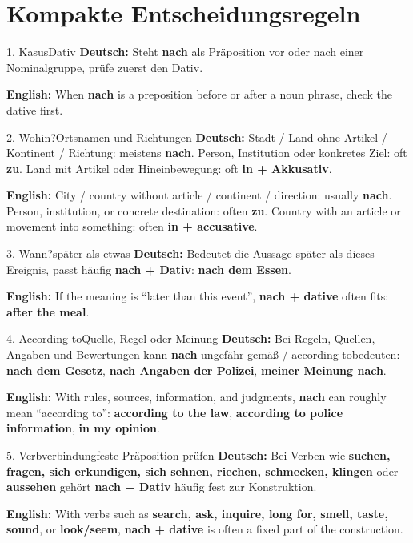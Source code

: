 \documentclass[a4paper,11pt]{article}
\newcommand{\GermanText}[1]{\textbf{Deutsch: }#1\par}
\newcommand{\EnglishText}[1]{{\small\color{SoftGray}\textbf{English: }#1\par}}
\begin{document}
    \section{Kompakte Entscheidungsregeln}

        \begin{grammarentry}{1. Kasus}{Dativ}
            \GermanText{Steht \textbf{nach} als Präposition vor oder nach einer Nominalgruppe, prüfe zuerst den Dativ.}
            \EnglishText{When \textbf{nach} is a preposition before or after a noun phrase, check the dative first.}
        \end{grammarentry}

        \begin{grammarentry}{2. Wohin?}{Ortsnamen und Richtungen}
            \GermanText{Stadt / Land ohne Artikel / Kontinent / Richtung: meistens \textbf{nach}. Person, Institution oder konkretes Ziel: oft \textbf{zu}. Land mit Artikel oder Hineinbewegung: oft \textbf{in + Akkusativ}.}
            \EnglishText{City / country without article / continent / direction: usually \textbf{nach}. Person, institution, or concrete destination: often \textbf{zu}. Country with an article or movement into something: often \textbf{in + accusative}.}
        \end{grammarentry}

        \begin{grammarentry}{3. Wann?}{später als etwas}
            \GermanText{Bedeutet die Aussage \glqq später als dieses Ereignis\grqq, passt häufig \textbf{nach + Dativ}: \textbf{nach dem Essen}.}
            \EnglishText{If the meaning is ``later than this event'', \textbf{nach + dative} often fits: \textbf{after the meal}.}
        \end{grammarentry}

        \begin{grammarentry}{4. According to}{Quelle, Regel oder Meinung}
            \GermanText{Bei Regeln, Quellen, Angaben und Bewertungen kann \textbf{nach} ungefähr \glqq gemäß / according to\grqq bedeuten: \textbf{nach dem Gesetz}, \textbf{nach Angaben der Polizei}, \textbf{meiner Meinung nach}.}
            \EnglishText{With rules, sources, information, and judgments, \textbf{nach} can roughly mean ``according to'': \textbf{according to the law}, \textbf{according to police information}, \textbf{in my opinion}.}
        \end{grammarentry}

        \begin{grammarentry}{5. Verbverbindung}{feste Präposition prüfen}
            \GermanText{Bei Verben wie \textbf{suchen, fragen, sich erkundigen, sich sehnen, riechen, schmecken, klingen} oder \textbf{aussehen} gehört \textbf{nach + Dativ} häufig fest zur Konstruktion.}
            \EnglishText{With verbs such as \textbf{search, ask, inquire, long for, smell, taste, sound}, or \textbf{look/seem}, \textbf{nach + dative} is often a fixed part of the construction.}
        \end{grammarentry}
\end{document}
